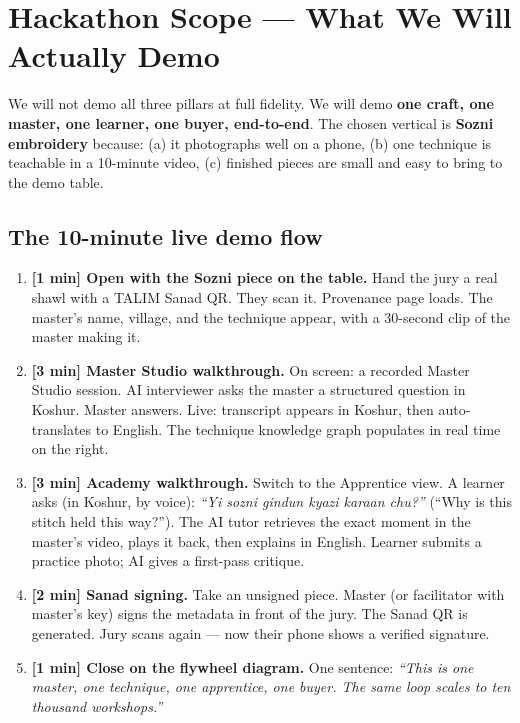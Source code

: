 \documentclass[11pt, a4paper]{article}
\begin{document}
\section{Hackathon Scope — What We Will Actually Demo}

We will not demo all three pillars at full fidelity. We will demo \textbf{one craft, one master, one learner, one buyer, end-to-end}. The chosen vertical is \textbf{Sozni embroidery} because: (a) it photographs well on a phone, (b) one technique is teachable in a 10-minute video, (c) finished pieces are small and easy to bring to the demo table.

\subsection{The 10-minute live demo flow}

\begin{enumerate}
  \item \textbf{[1 min] Open with the Sozni piece on the table.} Hand the jury a real shawl with a TALIM Sanad QR. They scan it. Provenance page loads. The master's name, village, and the technique appear, with a 30-second clip of the master making it.
  \item \textbf{[3 min] Master Studio walkthrough.} On screen: a recorded Master Studio session. AI interviewer asks the master a structured question in Koshur. Master answers. Live: transcript appears in Koshur, then auto-translates to English. The technique knowledge graph populates in real time on the right.
  \item \textbf{[3 min] Academy walkthrough.} Switch to the Apprentice view. A learner asks (in Koshur, by voice): {\itshape ``Yi sozni gindun kyazi karaan chu?''} (``Why is this stitch held this way?''). The AI tutor retrieves the exact moment in the master's video, plays it back, then explains in English. Learner submits a practice photo; AI gives a first-pass critique.
  \item \textbf{[2 min] Sanad signing.} Take an unsigned piece. Master (or facilitator with master's key) signs the metadata in front of the jury. The Sanad QR is generated. Jury scans again — now their phone shows a verified signature.
  \item \textbf{[1 min] Close on the flywheel diagram.} One sentence: {\itshape ``This is one master, one technique, one apprentice, one buyer. The same loop scales to ten thousand workshops.''}
\end{enumerate}
\end{document}
